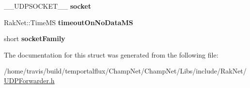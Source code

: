 \begin{DoxyCompactItemize}
\item 
\hypertarget{struct_rak_net_1_1_u_d_p_forwarder_1_1_forward_entry_afa010292bdc20079e89943e5285f061b}{\-\_\-\-\_\-\-U\-D\-P\-S\-O\-C\-K\-E\-T\-\_\-\-\_\- {\bfseries socket}}\label{struct_rak_net_1_1_u_d_p_forwarder_1_1_forward_entry_afa010292bdc20079e89943e5285f061b}

\item 
\hypertarget{struct_rak_net_1_1_u_d_p_forwarder_1_1_forward_entry_ae02b63cd03a8b0645b87017e472ec925}{Rak\-Net\-::\-Time\-M\-S {\bfseries timeout\-On\-No\-Data\-M\-S}}\label{struct_rak_net_1_1_u_d_p_forwarder_1_1_forward_entry_ae02b63cd03a8b0645b87017e472ec925}

\item 
\hypertarget{struct_rak_net_1_1_u_d_p_forwarder_1_1_forward_entry_af1be71b0306f3af356cad65d34ee3342}{short {\bfseries socket\-Family}}\label{struct_rak_net_1_1_u_d_p_forwarder_1_1_forward_entry_af1be71b0306f3af356cad65d34ee3342}

\end{DoxyCompactItemize}


The documentation for this struct was generated from the following file\-:\begin{DoxyCompactItemize}
\item 
/home/travis/build/temportalflux/\-Champ\-Net/\-Champ\-Net/\-Libs/include/\-Rak\-Net/\hyperlink{_u_d_p_forwarder_8h}{U\-D\-P\-Forwarder.\-h}\end{DoxyCompactItemize}

